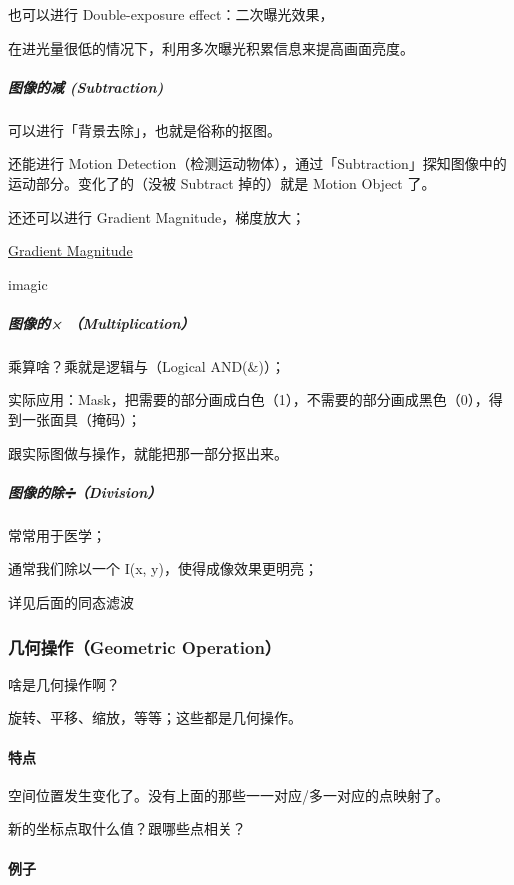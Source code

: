 \documentclass[
]{article}
\begin{document}
也可以进行 Double-exposure effect：二次曝光效果，

在进光量很低的情况下，利用多次曝光积累信息来提高画面亮度。

\hypertarget{header-n49}{%
\subparagraph{图像的减 (Subtraction)}\label{header-n49}}

可以进行「背景去除」，也就是俗称的抠图。

还能进行 Motion
Detection（检测运动物体），通过「Subtraction」探知图像中的运动部分。变化了的（没被
Subtract 掉的）就是 Motion Object 了。

还还可以进行 Gradient Magnitude，梯度放大；

\href{https://www.sciencedirect.com/topics/engineering/gradient-magnitude}{Gradient
Magnitude}

imagic

\hypertarget{header-n55}{%
\subparagraph{图像的× （Multiplication）}\label{header-n55}}

乘算啥？乘就是逻辑与（Logical AND(\&)）；

实际应用：Mask，把需要的部分画成白色（1），不需要的部分画成黑色（0），得到一张面具（掩码）；

跟实际图做与操作，就能把那一部分抠出来。

\hypertarget{header-n59}{%
\subparagraph{图像的除➗（Division）}\label{header-n59}}

常常用于医学；

通常我们除以一个 I(x, y)，使得成像效果更明亮；

详见后面的同态滤波

\hypertarget{header-n63}{%
\subsubsection{几何操作（Geometric Operation）}\label{header-n63}}

啥是几何操作啊？

旋转、平移、缩放，等等；这些都是几何操作。

\hypertarget{header-n66}{%
\paragraph{特点}\label{header-n66}}

空间位置发生变化了。没有上面的那些一一对应/多一对应的点映射了。

新的坐标点取什么值？跟哪些点相关？

\hypertarget{header-n69}{%
\paragraph{例子}\label{header-n69}}
\end{document}
